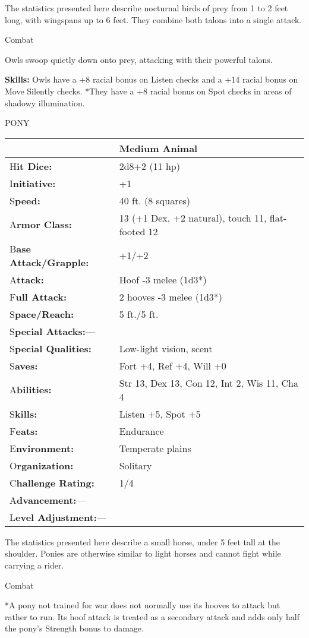 \documentclass{article}
\begin{document}
The statistics presented here describe nocturnal birds of prey from 1 to 2 feet 
long, with wingspans up to 6 feet. They combine both talons into a single attack.

Combat

Owls swoop quietly down onto prey, attacking with their powerful talons.

\textbf{Skills:} Owls have a +8 racial bonus on Listen checks and a +14 racial 
bonus on Move Silently checks. *They have a +8 racial bonus on Spot checks in areas 
of shadowy illumination.

\vspace{12pt}
PONY

\begin{tabular}{|>{\raggedright}p{91pt}|>{\raggedright}p{193pt}|}
\hline
  & Medium Animal\tabularnewline
\hline
H\textbf{it Dice:} & 2d8+2 (11 hp)\tabularnewline
\hline
I\textbf{nitiative:} & +1\tabularnewline
\hline
S\textbf{peed:} & 40 ft. (8 squares)\tabularnewline
\hline
A\textbf{rmor Class:} & 13 (+1 Dex, +2 natural), touch 11, flat-footed 12\tabularnewline
\hline
B\textbf{ase Attack/Grapple:} & +1/+2\tabularnewline
\hline
A\textbf{ttack:} & Hoof -3 melee (1d3*)\tabularnewline
\hline
F\textbf{ull Attack:} & 2 hooves -3 melee (1d3*)\tabularnewline
\hline
S\textbf{pace/Reach:} & 5 ft./5 ft.\tabularnewline
\hline
S\textbf{pecial Attacks:}--- & \tabularnewline
\hline
S\textbf{pecial Qualities:} & Low-light vision, scent\tabularnewline
\hline
S\textbf{aves:} & Fort +4, Ref +4, Will +0\tabularnewline
\hline
A\textbf{bilities:} & Str 13, Dex 13, Con 12, Int 2, Wis 11, Cha 4\tabularnewline
\hline
S\textbf{kills:} & Listen +5, Spot +5\tabularnewline
\hline
F\textbf{eats:} & Endurance\tabularnewline
\hline
E\textbf{nvironment:} & Temperate plains\tabularnewline
\hline
O\textbf{rganization:} & Solitary\tabularnewline
\hline
C\textbf{hallenge Rating:} & 1/4\tabularnewline
\hline
A\textbf{dvancement:}--- & \tabularnewline
\hline
L\textbf{evel Adjustment:}--- & \tabularnewline
\hline
\end{tabular}

The statistics presented here describe a small horse, under 5 feet tall at the 
shoulder. Ponies are otherwise similar to light horses and cannot fight while carrying 
a rider.

Combat

*A pony not trained for war does not normally use its hooves to attack but rather 
to run. Its hoof attack is treated as a secondary attack and adds only half the 
pony's Strength bonus to damage.
\end{document}
